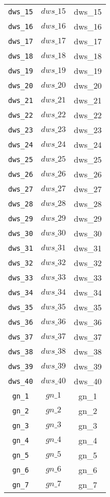 \begin{center}
\begin{longtable}{ccc}
\texttt{dws\_15} & $dws\_15$ & dws\_15\\
\texttt{dws\_16} & $dws\_16$ & dws\_16\\
\texttt{dws\_17} & $dws\_17$ & dws\_17\\
\texttt{dws\_18} & $dws\_18$ & dws\_18\\
\texttt{dws\_19} & $dws\_19$ & dws\_19\\
\texttt{dws\_20} & $dws\_20$ & dws\_20\\
\texttt{dws\_21} & $dws\_21$ & dws\_21\\
\texttt{dws\_22} & $dws\_22$ & dws\_22\\
\texttt{dws\_23} & $dws\_23$ & dws\_23\\
\texttt{dws\_24} & $dws\_24$ & dws\_24\\
\texttt{dws\_25} & $dws\_25$ & dws\_25\\
\texttt{dws\_26} & $dws\_26$ & dws\_26\\
\texttt{dws\_27} & $dws\_27$ & dws\_27\\
\texttt{dws\_28} & $dws\_28$ & dws\_28\\
\texttt{dws\_29} & $dws\_29$ & dws\_29\\
\texttt{dws\_30} & $dws\_30$ & dws\_30\\
\texttt{dws\_31} & $dws\_31$ & dws\_31\\
\texttt{dws\_32} & $dws\_32$ & dws\_32\\
\texttt{dws\_33} & $dws\_33$ & dws\_33\\
\texttt{dws\_34} & $dws\_34$ & dws\_34\\
\texttt{dws\_35} & $dws\_35$ & dws\_35\\
\texttt{dws\_36} & $dws\_36$ & dws\_36\\
\texttt{dws\_37} & $dws\_37$ & dws\_37\\
\texttt{dws\_38} & $dws\_38$ & dws\_38\\
\texttt{dws\_39} & $dws\_39$ & dws\_39\\
\texttt{dws\_40} & $dws\_40$ & dws\_40\\
\texttt{gn\_1} & $gn\_1$ & gn\_1\\
\texttt{gn\_2} & $gn\_2$ & gn\_2\\
\texttt{gn\_3} & $gn\_3$ & gn\_3\\
\texttt{gn\_4} & $gn\_4$ & gn\_4\\
\texttt{gn\_5} & $gn\_5$ & gn\_5\\
\texttt{gn\_6} & $gn\_6$ & gn\_6\\
\texttt{gn\_7} & $gn\_7$ & gn\_7\\

\end{longtable}
\end{center}
